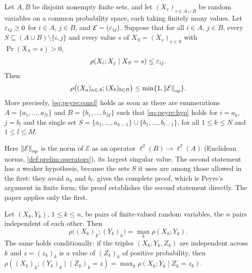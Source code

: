 \begin{theorem}\label{thm:peyre-finite}
Let $A,B$ be disjoint nonempty finite sets, and let $(X_v)_{v\in A\cup B}$ be
random variables on a common probability space, each taking finitely many
values. Let $\varepsilon_{ij}\ge0$ for $i\in A$, $j\in B$, and
$\mathcal E=(\varepsilon_{ij})$. Suppose that for all $i\in A$, $j\in B$, every
$S\subseteq(A\cup B)\setminus\{i,j\}$ and every value $s$ of
$X_S=(X_v)_{v\in S}$ with $\Pr(X_S=s)>0$,
\begin{equation}\label{eq:peyre:hyp}
  \rho(X_i;X_j\mid X_S=s)\le\varepsilon_{ij}.
\end{equation}
Then
\begin{equation}\label{eq:peyre:concl}
  \rho\big((X_a)_{a\in A};(X_b)_{b\in B}\big)\le\min\{1,\left\|\mathcal E\right\|_{\mathrm{op}}\}.
\end{equation}
More precisely, \eqref{eq:peyre:concl} holds as soon as there are enumerations
$A=\{a_1,\dots,a_N\}$ and $B=\{b_1,\dots,b_M\}$ such that \eqref{eq:peyre:hyp}
holds for $i=a_k$, $j=b_l$ and the single set
$S=\{a_1,\dots,a_{k-1}\}\cup\{b_1,\dots,b_{l-1}\}$, for all $1\le k\le N$ and
$1\le l\le M$.
\end{theorem}

Here $\left\|\mathcal E\right\|_{\mathrm{op}}$ is the norm of $\mathcal E$ as an operator
$\ell^2(B)\to\ell^2(A)$ (Euclidean norms, \cref{def:prelim:operators}), its
largest singular value. The second statement has a weaker hypothesis, because
the sets $S$ it uses are among those allowed in the first: they avoid $a_k$
and $b_l$.  gives the complete proof, which is Peyre's argument in
finite form; the proof establishes the second statement directly. The paper
applies only the first.

\begin{corollary}\label{cor:peyre-independent}
Let $(X_k,Y_k)$, $1\le k\le n$, be pairs of finite-valued random variables,
the $n$ pairs independent of each other. Then
\[
 \rho\big((X_k)_k;(Y_k)_k\big)=\max_k\rho(X_k;Y_k).
\]
The same holds conditionally: if the triples $(X_k,Y_k,Z_k)$ are independent
across $k$ and $z=(z_k)_k$ is a value of $(Z_k)_k$ of positive probability,
then $\rho((X_k)_k;(Y_k)_k\mid(Z_k)_k=z)=\max_k\rho(X_k;Y_k\mid Z_k=z_k)$.
\end{corollary}

